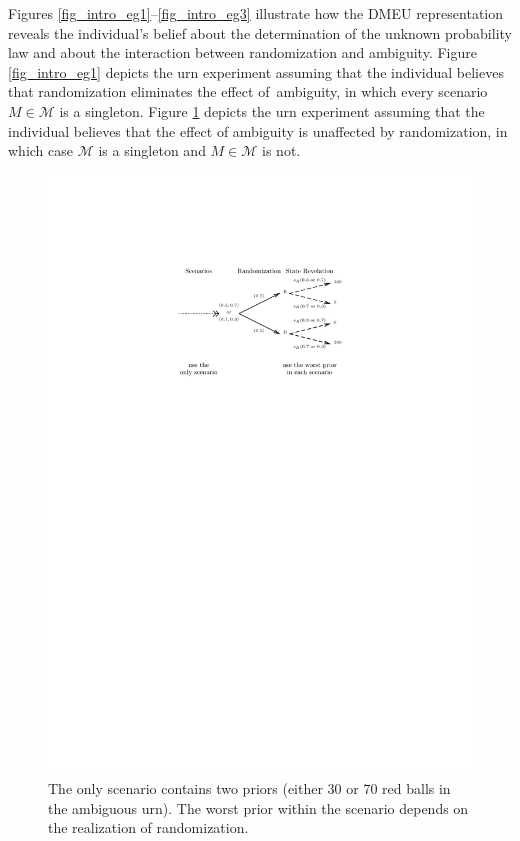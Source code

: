 \documentclass[12pt, notitlepage]{article}
\begin{document}
Figures \ref{fig_intro_eg1}--\ref{fig_intro_eg3} illustrate how the DMEU
representation reveals the individual's belief about the determination of
the unknown probability law and about the interaction between randomization
and ambiguity. Figure \ref{fig_intro_eg1} depicts the urn experiment assuming
that the individual believes that randomization eliminates the effect of\
ambiguity, in which every scenario $M\in \mathcal{M}$ is a singleton. Figure %
\ref{fig_intro_eg2} depicts the urn experiment assuming that the individual
believes that the effect of ambiguity is unaffected by randomization, in
which case $\mathcal{M}$ is a singleton and $M\in \mathcal{M}$ is not.

\begin{figure}[h!]
  \centering   
    \includegraphics{img/intro_eg2.pdf}
    \caption{The only
scenario contains two priors (either 30 or 70 red balls in the ambiguous
urn). The worst prior within the scenario depends on the realization of
randomization.}
\label{fig_intro_eg2}
\end{figure}
\end{document}
